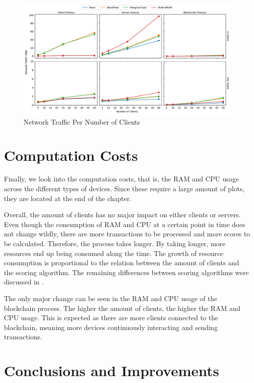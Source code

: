 \begin{figure}[!ht]
    \centering
    \includegraphics[width=\textwidth]{graphics/clients/traffic.pdf}
    \caption{Network Traffic Per Number of Clients}
    \label{fig:net_clients}
\end{figure}


\section{Computation Costs}

Finally, we look into the computation costs, that is, the RAM and CPU usage across the different types of devices. Since these require a large amount of plots, they are located at the end of the chapter.

Overall, the amount of clients has no major impact on either clients or servers. Even though the consumption of RAM and CPU at a certain point in time does not change wildly, there are more transactions to be processed and more scores to be calculated. Therefore, the process takes longer. By taking longer, more resources end up being consumed along the time. The growth of resource consumption is proportional to the relation between the amount of clients and the scoring algorithm. The remaining differences between scoring algorithms were discussed in .

The only major change can be seen in the RAM and CPU usage of the blockchain process. The higher the amount of clients, the higher the RAM and CPU usage. This is expected as there are more clients connected to the blockchain, meaning more devices continuously interacting and sending transactions.

\section{Conclusions and Improvements}

